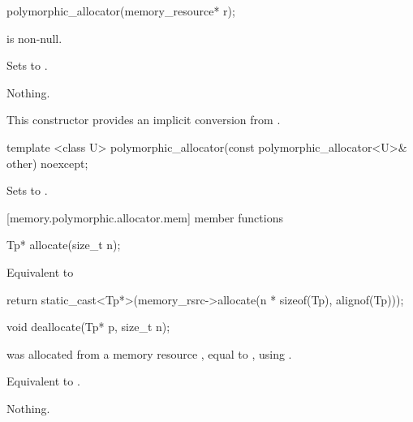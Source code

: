 %
\begin{itemdecl}
polymorphic_allocator(memory_resource* r);
\end{itemdecl}

\begin{itemdescr}
\pnum
\requires
{} is non-null.

\pnum
\effects
Sets  to .

\pnum
\throws
Nothing.

\pnum
\realnotes
This constructor provides an implicit conversion from .
\end{itemdescr}

%
\begin{itemdecl}
template <class U>
  polymorphic_allocator(const polymorphic_allocator<U>& other) noexcept;
\end{itemdecl}

\begin{itemdescr}
\pnum
\effects
Sets  to .
\end{itemdescr}


[memory.polymorphic.allocator.mem]{ member functions}

%
%
\begin{itemdecl}
Tp* allocate(size_t n);
\end{itemdecl}

\begin{itemdescr}
\pnum
\returns
Equivalent to
\begin{codeblock}
return static_cast<Tp*>(memory_rsrc->allocate(n * sizeof(Tp), alignof(Tp)));
\end{codeblock}
\end{itemdescr}

%
%
\begin{itemdecl}
void deallocate(Tp* p, size_t n);
\end{itemdecl}

\begin{itemdescr}
\pnum
\requires
{} was allocated from a memory resource ,
equal to ,
using .

\pnum
\effects
Equivalent to .

\pnum
\throws
Nothing.
\end{itemdescr}

